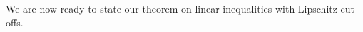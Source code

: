 \documentclass[12pt,a4paper,twoside,reqno]{amsart}
\newtheorem{Theorem}{Theorem}
\newcommand{\degen}{\operatorname{degen}}
\newcommand{\rank}{\operatorname{rank}}
\numberwithin{equation}{section}
\begin{document}



We are now ready to state our theorem on linear inequalities with Lipschitz cut-offs. 
\end{document}
